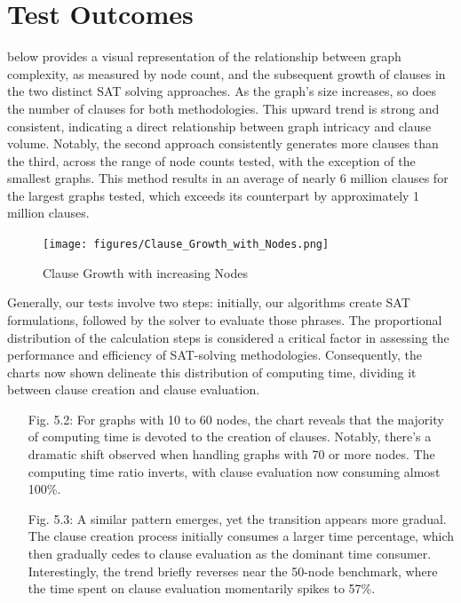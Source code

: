 \documentclass[bachelor, english]{algothesis}
\begin{document}
\section{Test Outcomes}
 below provides a visual representation of the relationship between graph complexity, as measured by node count, and the subsequent growth of clauses in the two distinct SAT solving approaches. As the graph's size increases, so does the number of clauses for both methodologies. This upward trend is strong and consistent, indicating a direct relationship between graph intricacy and clause volume. Notably, the second approach consistently generates more clauses than the third, across the range of node counts tested, with the exception of the smallest graphs. This method results in an average of nearly 6 million clauses for the largest graphs tested, which exceeds its counterpart by approximately 1 million clauses.
\begin{figure}[ht]
    \hspace{-1,75cm}
    \texttt{[image: figures/Clause\_Growth\_with\_Nodes.png]}
    \caption{Clause Growth with increasing Nodes}
    \label{fig:clause_growth}
\end{figure}

\noindent
Generally, our tests involve two steps: initially, our algorithms create SAT formulations, followed by the solver to evaluate those phrases. The proportional distribution of the calculation steps is considered a critical factor in assessing the performance and efficiency of SAT-solving methodologies. Consequently, the charts now shown delineate this distribution of computing time, dividing it between clause creation and clause evaluation.
\begin{enumerate}
    \item [Fig. 5.2:] For graphs with 10 to 60 nodes, the chart reveals that the majority of computing time is devoted to the creation of clauses. Notably, there's a dramatic shift observed when handling graphs with 70 or more nodes. The computing time ratio inverts, with clause evaluation now consuming almost 100\%.
    \item [Fig. 5.3:] A similar pattern emerges, yet the transition appears more gradual. The clause creation process initially consumes a larger time percentage, which then gradually cedes to clause evaluation as the dominant time consumer. Interestingly, the trend briefly reverses near the 50-node benchmark, where the time spent on clause evaluation momentarily spikes to 57\%.
\end{enumerate}
\end{document}
